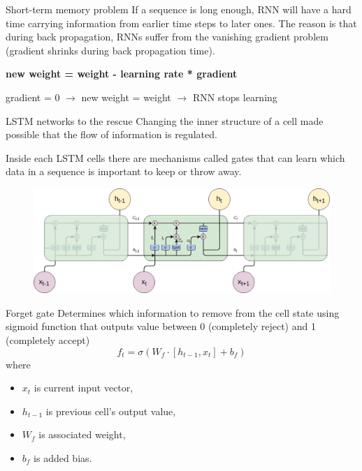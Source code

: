 \documentclass{beamer}
\begin{document}
  \begin{frame}{Short-term memory problem}
    If a sequence is long enough, RNN will have a hard time carrying information from earlier time steps to later ones.
    The reason is that during back propagation, RNNs suffer from the vanishing gradient problem (gradient shrinks during back propagation time).
    \begin{center}
      \textbf{new weight = weight - learning rate * gradient}

      gradient = 0 $\rightarrow$ new weight = weight $\rightarrow$ RNN stops learning 
    \end{center}
  \end{frame}

  \begin{frame}{LSTM networks to the rescue}
    Changing the inner structure of a cell made possible that the flow of information is regulated.

    Inside each LSTM cells there are mechanisms called \alert{gates} that can learn which data in a sequence is important to keep or throw away.
  \end{frame}
  \begin{frame}
    \begin{figure}[]
      \centering
      \includegraphics[width=\linewidth]{images/LSTM.png}
    \end{figure}
  \end{frame}

  \begin{frame}{Forget gate}  
    Determines which information to remove from the cell state using sigmoid function that outputs value between 0 (completely reject) and 1 (completely accept)
		$$ f_{t} = \sigma (W_{f} \cdot [h_{t-1}, x_{t}] + b_{f}) $$
		where
		\begin{itemize}
			\item[] $ x_{t} $ is current input vector,
			\item[] $ h_{t-1} $ is previous cell's output value,
			\item[] $ W_{f} $ is associated weight,
			\item[] $ b_{f} $ is added bias.
    \end{itemize}
  \end{frame}
\end{document}
